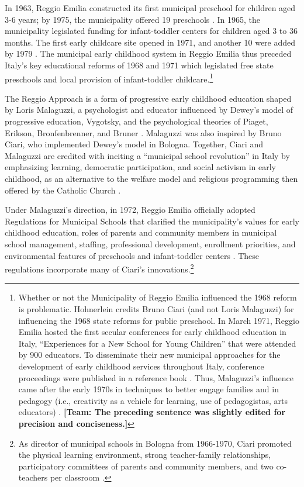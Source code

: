 In 1963, Reggio Emilia constructed its first municipal preschool for children aged 3-6 years; by 1975, the municipality offered 19 preschools \citep{Hohnerlein_2009_Paradox-Public-Preschools}. In 1965, the municipality legislated funding for infant-toddler centers for children aged 3 to 36 months. The first early childcare site opened in 1971, and another 10 were added by 1979 \citep{Cagliari-etal-eds_2016_BOOK_Loris-Malaguzzi}. The municipal early childhood system in Reggio Emilia thus preceded Italy's key educational reforms of 1968 and 1971 which legislated free state preschools and local provision of infant-toddler childcare.\footnote{Whether or not the Municipality of Reggio Emilia influenced the 1968 reform is problematic. Hohnerlein \citeyearpar{Hohnerlein_2009_Paradox-Public-Preschools} credits Bruno Ciari (and not Loris Malaguzzi) for influencing the 1968 state reforms for public preschool. In March 1971, Reggio Emilia hosted the first secular conferences for early childhood education in Italy, ``Experiences for a New School for Young Children'' that were attended by 900 educators. To disseminate their new municipal approaches for the development of early childhood services throughout Italy, conference proceedings were published in a reference book \citep{Cagliari-etal-eds_2016_BOOK_Loris-Malaguzzi}. Thus, Malaguzzi's influence came after the early 1970s in techniques to better engage families and in pedagogy (i.e., creativity as a vehicle for learning, use of pedagogistas, arts educators) \citep{OECD_2001_Italy-Country-Note}. \textbf{[Team: The preceding sentence was slightly edited for precision and conciseness.]} }

The Reggio Approach is a form of progressive early childhood education shaped by Loris Malaguzzi, a psychologist and educator influenced by Dewey's model of progressive education, Vygotsky, and the psychological theories of Piaget, Erikson, Bronfenbrenner, and Bruner \citep{Rinaldi_2006_ReggioEmilia_BOOK,Cagliari-etal-eds_2016_BOOK_Loris-Malaguzzi}. Malaguzzi was also inspired by Bruno Ciari, who implemented Dewey's model in Bologna. Together, Ciari and Malaguzzi are credited with inciting a ``municipal school revolution'' in Italy by emphasizing learning, democratic participation, and social activism in early childhood, as an alternative to the welfare model and religious programming then offered by the Catholic Church \citep{Lazzari_2012_Euro-J-Edu,Cagliari-etal-eds_2016_BOOK_Loris-Malaguzzi}.

Under Malaguzzi's direction, in 1972, Reggio Emilia officially adopted Regulations for Municipal Schools that clarified the municipality's values for early childhood education, roles of parents and community members in municipal school management, staffing, professional development, enrollment priorities, and environmental features of preschools and infant-toddler centers \citep{Giaroni_1972_Regulations-Municipal-EC-Schools}. These regulations incorporate many of Ciari's innovations.\footnote{As director of municipal schools in Bologna from 1966-1970, Ciari promoted the physical learning environment, strong teacher-family relationships, participatory committees of parents and community members, and two co-teachers per classroom \citep{Edwards-etal-eds_1998_Hundred-Languages}.}


